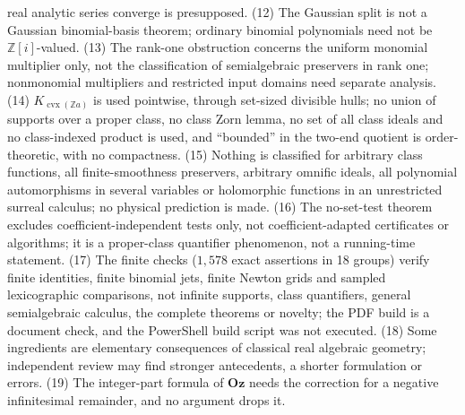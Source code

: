 \documentclass[11pt,letterpaper]{article}
\numberwithin{equation}{section}
\theoremstyle{definition}
\theoremstyle{remark}
\theoremstyle{plain}
\newcommand{\Oz}{\mathbf{Oz}}
\newcommand{\Z}{\mathbb Z}
\begin{document}
real analytic series converge is presupposed. (12) The Gaussian split is not a Gaussian binomial-basis theorem; ordinary binomial polynomials need not be
$\Z[i]$-valued. (13) The rank-one obstruction concerns the uniform monomial multiplier only, not the classification of semialgebraic preservers in rank
one; nonmonomial multipliers and restricted input domains need separate analysis. (14) $K_{\operatorname{cvx}(\Z a)}$ is used pointwise, through
set-sized divisible hulls; no union of supports over a proper class, no class Zorn lemma, no set of all class ideals and no class-indexed product is
used, and ``bounded'' in the two-end quotient is order-theoretic, with no compactness. (15) Nothing is classified for arbitrary class functions, all
finite-smoothness preservers, arbitrary omnific ideals, all polynomial automorphisms in several variables or holomorphic functions in an unrestricted
surreal calculus; no physical prediction is made. (16) The no-set-test theorem excludes coefficient-independent tests only, not coefficient-adapted
certificates or algorithms; it is a proper-class quantifier phenomenon, not a running-time statement. (17) The finite checks ($1{,}578$ exact assertions in
18 groups) verify finite identities, finite binomial jets, finite Newton grids and sampled lexicographic comparisons, not infinite supports, class
quantifiers, general semialgebraic calculus, the complete theorems or novelty; the PDF build is a document check, and the PowerShell build script was not
executed. (18) Some ingredients are elementary consequences of classical real algebraic geometry; independent review may find stronger antecedents, a
shorter formulation or errors. (19) The integer-part formula of $\Oz$ needs the correction for a negative infinitesimal remainder, and no argument drops it.
\end{document}
